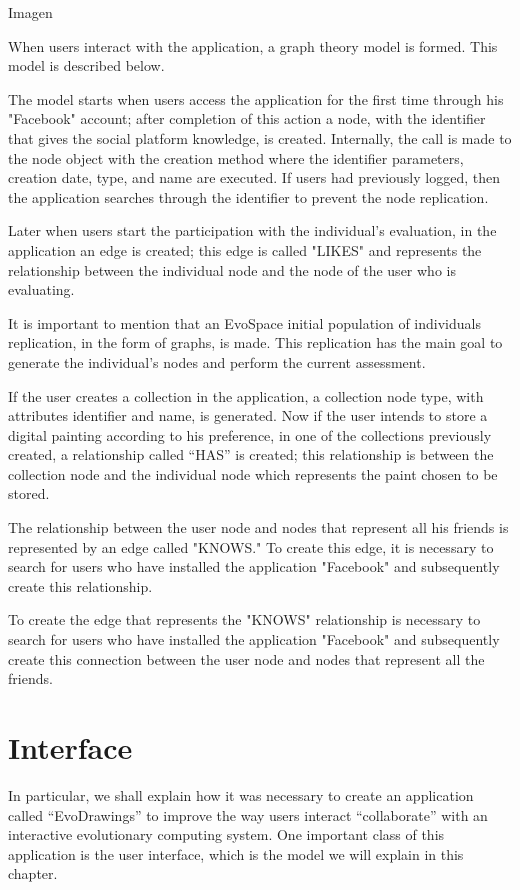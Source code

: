 Imagen


When users interact with the application, a graph theory model is formed. This
model is described below.

The model starts when users access the application for the first time through
his "Facebook" account; after completion of this action a node, with the
identifier that gives the social platform knowledge, is created. Internally, the
call is made to the node object with the creation method where the identifier
parameters, creation date, type, and name are executed.  If users had previously
logged, then the application searches through the identifier to prevent the node
replication.

Later when users start the participation with the individual's evaluation, in
the application an edge is created; this edge is called "LIKES" and represents
the relationship between the individual node and the node of the user who is
evaluating.

It is important to mention that an EvoSpace initial population of individuals
replication, in the form of graphs, is made. This replication has the main goal
to generate the individual's nodes and perform the current assessment.

If the user creates a collection in the application, a collection node type,
with attributes identifier and name, is generated. Now if the user intends to
store a digital painting according to his preference, in one of the collections
previously created, a relationship called “HAS” is created; this relationship is
between the collection node and the individual node which represents the paint
chosen to be stored.

The relationship between the user node and nodes that represent all his friends
is represented by an edge called "KNOWS." To create this edge, it is necessary
to search for users who have installed the application "Facebook" and
subsequently create this relationship.

To create the edge that represents the "KNOWS" relationship is necessary to
search for users who have installed the application "Facebook" and subsequently
create this connection between the user node and nodes that represent all the
friends.

\section{Interface}
In particular, we shall explain how it was necessary to create an application called “EvoDrawings” to improve the way users interact “collaborate” with an interactive evolutionary computing system. One important class of this application is the user interface, which is the model we will explain in this chapter.

